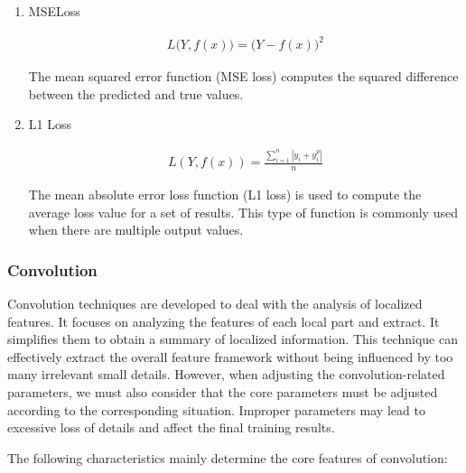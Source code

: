 \documentclass[10pt,journal,compsoc]{IEEEtran}
\begin{document}
\begin{enumerate}
    \item MSELoss

\begin{align}
    L \bigl (Y, f(x) \bigr) = \bigl( Y - f(x) \bigr)^2
\end{align}

The mean squared error function (MSE loss) computes the squared difference between the predicted and true values. 

    \item L1 Loss \cite{14}

\begin{align}
    L(Y, f(x)) = \frac{\sum_{i=1}^{n} {|y_i + y_i^p|}}
                      {n}
\end{align}

The mean absolute error loss function (L1 loss) is used to compute the average loss value for a set of results. This type of function is commonly used when there are multiple output values.

\end{enumerate}

\subsubsection{Convolution}

Convolution techniques are developed to deal with the analysis of localized features. It focuses on analyzing the features of each local part and extract. It simplifies them to obtain a summary of localized information. This technique can effectively extract the overall feature framework without being influenced by too many irrelevant small details. However, when adjusting the convolution-related parameters, we must also consider that the core parameters must be adjusted according to the corresponding situation. Improper parameters may lead to excessive loss of details and affect the final training results.

The following characteristics mainly determine the core features of convolution:
\end{document}
